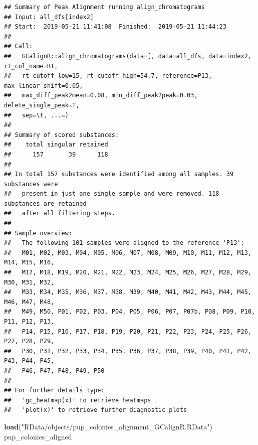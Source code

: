 \documentclass[]{article}
\newenvironment{Shaded}{\begin{snugshade}}{\end{snugshade}}
\newcommand{\KeywordTok}[1]{\textcolor[rgb]{0.13,0.29,0.53}{\textbf{#1}}}
\newcommand{\StringTok}[1]{\textcolor[rgb]{0.31,0.60,0.02}{#1}}
\newcommand{\NormalTok}[1]{#1}
\begin{document}
\begin{verbatim}
## Summary of Peak Alignment running align_chromatograms
## Input: all_dfs[index2]
## Start:  2019-05-21 11:41:08  Finished:  2019-05-21 11:44:23 
## 
## Call:
##   GCalignR::align_chromatograms(data=[, data=all_dfs, data=index2, rt_col_name=RT,
##   rt_cutoff_low=15, rt_cutoff_high=54.7, reference=P13, max_linear_shift=0.05,
##   max_diff_peak2mean=0.08, min_diff_peak2peak=0.03, delete_single_peak=T,
##   sep=\t, ...=)
## 
## Summary of scored substances:
##    total singular retained 
##      157       39      118 
## 
## In total 157 substances were identified among all samples. 39 substances were
##   present in just one single sample and were removed. 118 substances are retained
##   after all filtering steps.
## 
## Sample overview:
##   The following 101 samples were aligned to the reference 'P13':
##   M01, M02, M03, M04, M05, M06, M07, M08, M09, M10, M11, M12, M13, M14, M15, M16,
##   M17, M18, M19, M20, M21, M22, M23, M24, M25, M26, M27, M28, M29, M30, M31, M32,
##   M33, M34, M35, M36, M37, M38, M39, M40, M41, M42, M43, M44, M45, M46, M47, M48,
##   M49, M50, P01, P02, P03, P04, P05, P06, P07, P07b, P08, P09, P10, P11, P12, P13,
##   P14, P15, P16, P17, P18, P19, P20, P21, P22, P23, P24, P25, P26, P27, P28, P29,
##   P30, P31, P32, P33, P34, P35, P36, P37, P38, P39, P40, P41, P42, P43, P44, P45,
##   P46, P47, P48, P49, P50
## 
## For further details type:
##   'gc_heatmap(x)' to retrieve heatmaps
##   'plot(x)' to retrieve further diagnostic plots
\end{verbatim}

\begin{Shaded}
\begin{Highlighting}[]
\KeywordTok{load}\NormalTok{(}\StringTok{"RData/objects/pup_colonies_alignment_GCalignR.RData"}\NormalTok{)}
\NormalTok{pup_colonies_aligned}
\end{Highlighting}
\end{Shaded}
\end{document}
